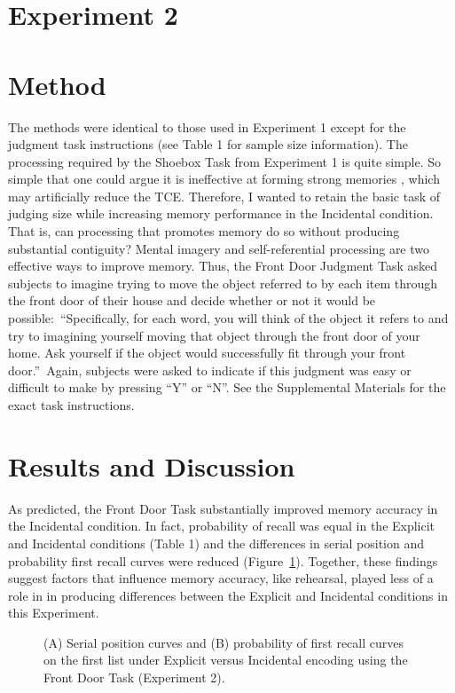 \documentclass[man,natbib,floatsintext]{apa6} %
\begin{document}
\section{Experiment 2}
\section{Method}

The methods were identical to those used in Experiment 1 except for the judgment task instructions (see Table 1 for sample size information).
The processing required by the Shoebox Task from Experiment 1 is quite simple. So simple that one could argue it is  ineffective at forming strong memories \label{newcite}\citep{EaglLeit64}, which may artificially reduce the TCE. Therefore, I wanted to retain the basic task of judging size while increasing memory performance in the Incidental condition. That is, can processing that promotes memory do so without producing substantial contiguity? Mental imagery and self-referential processing are two effective ways to improve memory. Thus, the Front Door Judgment Task asked subjects to imagine trying to move the object referred to by each item through the front door of their house and decide whether or not it would be possible:~\label{newinst}\color{red}``Specifically, for each word, you will think of the object it refers to and try to imagining yourself moving that object through the front door of your home. Ask yourself if the object would successfully fit through your front door.''\color{black}~Again, subjects were asked to indicate if this judgment was easy or difficult to make by pressing ``Y'' or ``N''. See the Supplemental Materials for the exact task instructions.

\section{Results and Discussion}
As predicted, the Front Door Task substantially improved memory accuracy in the Incidental condition. In fact, probability of recall was equal in the Explicit and Incidental conditions (Table 1) \color{red} and the differences in serial position and probability first recall curves were reduced (Figure~\ref{e2_l1_spc}). Together, these findings suggest factors that influence memory accuracy, like rehearsal, played less of a role in in producing differences between the Explicit and Incidental conditions in this Experiment.

\begin{figure}
\caption{(A) Serial position curves and (B) probability of first recall curves on the first list under Explicit versus Incidental encoding using the Front Door Task (Experiment 2).\spcpaneltext}
\label{e2_l1_spc}
\end{figure}
\end{document}
